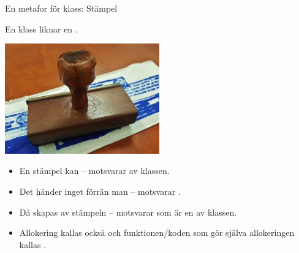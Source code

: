 \begin{Slide}{En metafor för klass: Stämpel}\SlideFontSmall
\begin{multicols}{2}

En klass liknar en .

\vspace{1em}\includegraphics[width=0.5\textwidth]{../img/stamp}

\columnbreak

\pause

\begin{itemize}
\item En stämpel kan  -- motsvarar  av klassen.
 \item Det händer inget förrän man  -- motsvarar .
\item Då skapas  av stämpeln -- motsvarar  som är en  av klassen.
\item Allokering kallas också  och funktionen/koden som gör själva allokeringen kallas .
\end{itemize}

\end{multicols}
\end{Slide}



